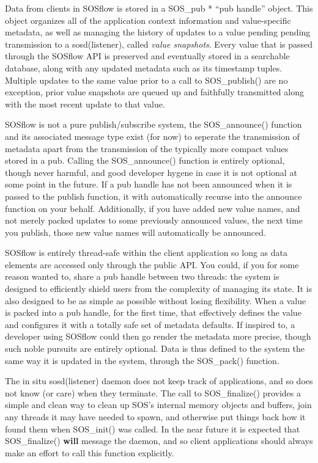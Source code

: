 Data from clients in SOSflow is stored in a SOS\_pub * ``pub handle''
object. This object organizes all of the application context
information and value-specific metadata, as well as managing the
history of updates to a value pending pending transmission to a
sosd(listener), called \textit{value snapshots}. Every value that is
passed through the SOSflow API is preserved and eventually stored in a
searchable database, along with any updated metadata such as its
timestamp tuples.  Multiple updates to the same value prior to a call
to SOS\_publish() are no exception, prior value snapshots are queued
up and faithfully transmitted along with the most recent update to
that value.

SOSflow is not a pure publish/subscribe system, the SOS\_announce()
function and its associated message type exist (for now) to seperate the
transmission of metadata apart from the transmission of the typically
more compact values stored in a pub.  Calling the SOS\_announce()
function is entirely optional, though never harmful, and good
developer hygene in case it is not optional at some point in the
future. If a pub handle has not been announced when it is passed to
the publish function, it with automatically recurse into the announce
function on your behalf.  Additionally, if you have added new value
names, and not merely packed updates to some previously announced
values, the next time you publish, those new value names will
automatically be announced.

SOSflow is entirely thread-safe within the client application so long
as data elements are accessed only through the public API. You could,
if you for some reason wanted to, share a pub handle between two
threads: the system is designed to efficiently shield users from the
complexity of managing its state.  It is also designed to be as simple
as possible without losing flexibility. When a value is packed into a
pub handle, for the first time, that effectively defines the value and
configures it with a totally safe set of metadata defaults. If inspired
to, a developer using SOSflow could then go render the metadata more
precise, though such noble pursuits are entirely optional. Data is
thus defined to the system the same way it is updated in the system,
through the SOS\_pack() function.

The in situ sosd(listener) daemon does not keep track of applications,
and so does not know (or care) when they terminate. The call to SOS\_finalize()
provides a simple and clean way to clean up SOS's internal memory objects
and buffers, join any threads it may have needed to spawn, and otherwise
put things back how it found them when SOS\_init() was called. In the
near future it is expected that SOS\_finalize() \textbf{will} message the
daemon, and so client applications should always make an effort to call
this function explicitly.


